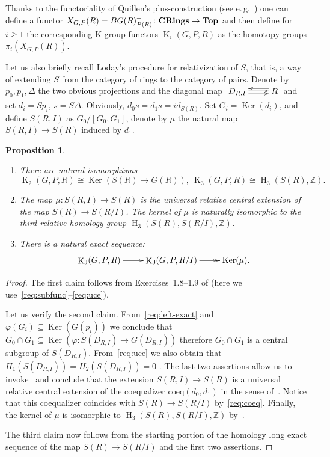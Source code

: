\documentclass[oneside, 8pt]{amsart}
\newtheorem{prop}{Proposition}
\theoremstyle{remark}
\theoremstyle{definition}
\DeclareMathOperator{\Ker}{Ker}
\DeclareMathOperator{\HH}{H}
\DeclareMathOperator{\K}{K}
\newcommand{\catname}[1]{{\normalfont\textbf{#1}}} %
\newcommand{\ZZ}{\mathbb{Z}}
\numberwithin{equation}{section}
\begin{document}
Thanks to the functoriality of Quillen's plus-construction (see e.\,g.~\cite[Proposition~5.2.4]{Ro95}) one can define a functor 
$X_{G, P}(R) = BG(R)^+_{P(R)} \colon \catname{CRings} \to \catname{Top}$ and then define for $i \geq 1$ the corresponding K-group functors $\K_{i}(G, P, R)$ as the homotopy groups $\pi_i(X_{G, P}(R))$.

Let us also briefly recall Loday's procedure for relativization of $S$, that is,
 a way of extending $S$ from the category of rings to the category of pairs.
Denote by $p_0, p_1, \Delta$ the two obvious projections and the diagonal map $\xymatrix{D_{R,I} \ar@<1pt>[r] \ar@<-2.5pt>[r] & \ar@<-4pt>[l] R}$
  and set $d_i = Sp_i$, $s = S\Delta$.
 Obviously, $d_0s = d_1 s = id_{S(R)}$. Set $G_i = \Ker(d_i)$, and define $S(R, I)$ as $ G_0 / [G_0, G_1]$, denote by $\mu$ the natural map $S(R, I) \to S(R)$ induced by $d_1$.

\begin{prop}\label{characterization}
\begin{enumerate}
 \item There are natural isomorphisms
  \[ \K_2(G, P, R) \cong \Ker(S(R) \to G(R)), \ \K_3(G, P, R) \cong \HH_3(S(R), \ZZ). \]
 \item The map $\mu \colon S(R, I) \to S(R)$ is the universal relative central extension of 
    the map $S(R) \to S(R/I)$. The kernel of $\mu$ is naturally isomorphic to the third relative homology group $\HH_3(S(R), S(R/I), \ZZ)$.
 \item There is a natural exact sequence:
 \[ \xymatrix{\K_3(G, P, R) \ar[r] & \K_3(G, P, R/I) \ar@{->>}[r] & \Ker(\mu).} \]
 \end{enumerate}   
\end{prop}
\begin{proof}
 The first claim follows from Exercises~1.8--1.9 of \cite[Chapter~IV]{Kbook} (here we use~\eqref{req:subfunc}--\eqref{req:uce}). %
 
 Let us verify the second claim. From~\eqref{req:left-exact} and $\varphi(G_i) \subseteq \Ker(G(p_i))$ we conclude that $G_0 \cap G_1 \subseteq \Ker(\varphi \colon S(D_{R, I}) \to G(D_{R, I}))$
  therefore $G_0 \cap G_1$ is a central subgroup of $S(D_{R, I})$.
 From~\eqref{req:uce} we also obtain that $H_1(S(D_{R,I})) = H_2(S(D_{R,I})) = 0$ .
 The last two assertions allow us to invoke~\cite[Proposition~6]{Lo78} and conclude that the extension $S(R, I) \to S(R)$ is a universal relative central extension of the coequalizer $\mathrm{coeq}(d_0, d_1)$
  in the sense of~\cite[\S~3]{Lo78}. 
 Notice that this coequalizer coincides with $S(R) \to S(R/I)$ by~\eqref{req:coeq}. 
 Finally, the kernel of $\mu$ is isomorphic to $\HH_3(S(R), S(R/I), \ZZ)$ by~\cite[Th{\'e}or{\`e}me~2]{Lo78}.
 
 The third claim now follows from the starting portion of the homology long exact sequence of the map $S(R) \to S(R/I)$ and the first two assertions.
\end{proof}
\end{document}
